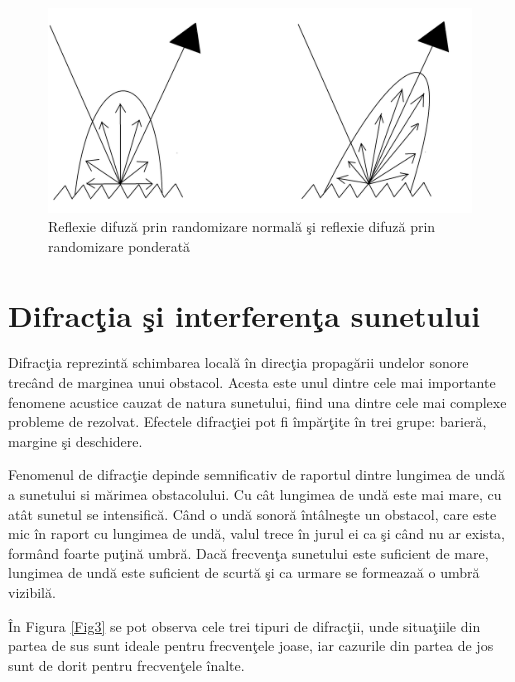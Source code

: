 	\begin{figure}[!htb]
		\centering
		\includegraphics[width=12cm]{imagini/reflections.png}
		\caption{Reflexie difuz\u{a} prin randomizare normal\u{a} \c{s}i reflexie difuz\u{a} prin randomizare ponderat\u{a}}
		\label{Fig10}
	\end{figure}

	\section{Difrac\c{t}ia \c{s}i interferen\c{t}a sunetului}
	
	Difrac\c{t}ia reprezint\u{a} schimbarea local\u{a} \^{i}n direc\c{t}ia propag\u{a}rii undelor sonore trec\^{a}nd de marginea unui obstacol. Acesta este unul dintre cele mai importante fenomene acustice cauzat de natura sunetului, fiind una dintre cele mai complexe probleme de rezolvat. Efectele difrac\c{t}iei pot fi \^{i}mp\u{a}r\c{t}ite \^{i}n trei grupe: barier\u{a}, margine \c{s}i deschidere.
	\bigskip
	
	Fenomenul de difrac\c{t}ie depinde semnificativ de raportul dintre lungimea de und\u{a} a sunetului si m\u{a}rimea obstacolului. Cu c\^{a}t lungimea de und\u{a} este mai mare, cu at\^{a}t sunetul se intensific\u{a}. C\^{a}nd o und\u{a} sonor\u{a} \^{i}nt\^{a}lne\c{s}te un obstacol, care este mic \^{i}n raport cu lungimea de und\u{a}, valul trece \^{i}n jurul ei ca \c{s}i c\^{a}nd nu ar exista, form\^{a}nd foarte pu\c{t}in\u{a} umbr\u{a}. Dac\u{a} frecven\c{t}a sunetului este suficient de mare, lungimea de und\u{a} este suficient de scurt\u{a} \c{s}i ca urmare se formeaza\u{a} o umbr\u{a} vizibil\u{a}.
	\bigskip
	
	\^{I}n Figura \ref{Fig3} se pot observa cele trei tipuri de difrac\c{t}ii, unde situa\c{t}iile din partea de sus sunt ideale pentru frecven\c{t}ele joase, iar cazurile din partea de jos sunt de dorit pentru frecven\c{t}ele \^{i}nalte.
	\bigskip
	
